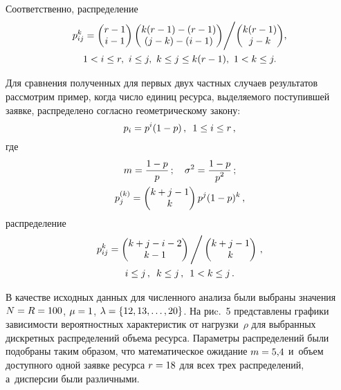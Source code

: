 \begin{multicols}{2}
 Соответственно, распределение 
  \begin{multline*}
  \hspace*{-0.26108pt}p_{ij}^k \hm= {\begin{pmatrix} r-1\\ i-1\end{pmatrix} \begin{pmatrix} k(r-1)-
(r-1)\\ (j-k) -(i-1)\end{pmatrix}}\Bigg/ {\begin{pmatrix} k(r-1)\\ j-k\end{pmatrix}},
\\ 
1< i\leq r,\ i\leq j,\ k\leq j \leq k(r-1),\ 1<k\leq j.
\end{multline*}
  
  Для сравнения полученных для первых двух частных случаев результатов 
рассмотрим пример, когда число единиц ресурса, выделяемого поступившей 
заявке, распределено согласно геометрическому закону: 
$$
p_i= p^i(1-p)\,, \enskip
1\leq i\leq r\,,
$$
где 
\begin{gather*}
m= \displaystyle\frac{\displaystyle 1-p\mathstrut}{\displaystyle p\mathstrut}\,;\quad \sigma^2= \displaystyle\frac{\displaystyle 1-p\mathstrut}{\displaystyle p^2\mathstrut}\,; \\
p_j^{(k)} = \begin{pmatrix} k+j-1\\ k\end{pmatrix} p^j (1-p)^k\,, 
\end{gather*}
распределение 
\begin{multline*}
p_{ij}^k = \begin{pmatrix} k+j-i-2\\ k-1\end{pmatrix} \Bigg/ 
\begin{pmatrix} k+j-1\\ k\end{pmatrix}\,,\\
i\leq j\,,\enskip k\leq j\,,\enskip 1< k\leq j\,.
\end{multline*}
  
  В качестве исходных данных для численного анализа были выбраны 
значения $N\hm=R\hm=100$, $\mu\hm= 1$, $\lambda\hm= \{12, 13,\ldots, 20\}$. 
На риc.~5 пред\-став\-ле\-ны графики зависимости вероятностных характеристик 
от нагрузки~$\rho$ для выбранных дискретных распределений объема ресурса. 
Параметры распределений были подобраны таким образом, что 
математическое ожидание $m\hm=5{,}4$ и~объем доступного одной заявке 
ресурса $r\hm=18$ для всех трех распределений, а~дисперсии были 
различными. 
 

\end{multicols}
